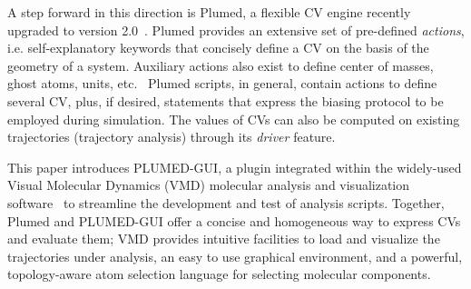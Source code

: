 \documentclass[preprint,review,11pt]{elsarticle}
\begin{document}
A step forward in this direction is Plumed, a flexible CV engine
recently upgraded to version 2.0~\cite{plumed2_this}. Plumed provides
an extensive set of pre-defined \emph{actions}, i.e. self-explanatory
keywords that concisely define a CV on the basis of the geometry of a
system. Auxiliary actions also exist to define center of masses, ghost
atoms, units, etc.~\cite{plumed_manual,bonomi_plumed:_2009}
Plumed scripts, in general, contain actions to define several CV,
plus, if desired, statements that express the biasing protocol to be
employed during simulation. The values of CVs can also
be computed on existing trajectories (trajectory analysis) through
its \emph{driver}  feature.

This paper introduces PLUMED-GUI, a plugin integrated within the
widely-used Visual Molecular Dynamics (VMD) molecular analysis and
visualization software~\cite{Humphrey_Dalke_Schulten_1996} to
streamline the development and test of analysis scripts.  Together,
Plumed and PLUMED-GUI offer a concise and homogeneous way to express
CVs and evaluate them; VMD provides intuitive facilities to load and
visualize the trajectories under analysis, an easy to use graphical
environment, and a powerful, topology-aware atom selection language
for selecting molecular components.











\end{document}
